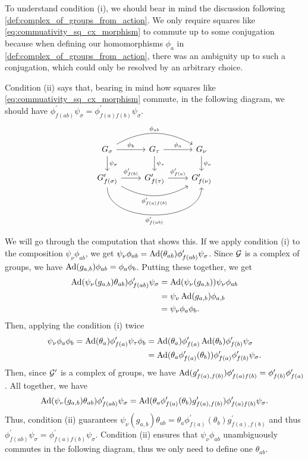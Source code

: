 To understand condition (i), we should bear in mind the discussion following \cref{def:complex_of_groups_from_action}.
We only require squares like \eqref{eq:commuativity_sq_cx_morphism} to commute up to some conjugation because when defining our homomorphisms $\phi_a$ in \cref{def:complex_of_groups_from_action}, there was an ambiguity up to such a conjugation, which could only be resolved by an arbitrary choice.

Condition (ii) says that, bearing in mind how squares like \eqref{eq:commuativity_sq_cx_morphism} commute, in the following diagram, we should have $\phi^\prime_{f(ab)}\psi_\sigma  = \phi^\prime_{f(a)f(b)}\psi_\sigma$.
\begin{equation}
	\begin{tikzcd}
		G_\sigma \ar[d, "\psi_\sigma"] \ar[r, "\phi_b"] \ar[rr, bend left, "\phi_{ab}"] & G_\tau \ar[d, "\psi_\tau"] \ar[r, "\phi_a"] & G_\nu \ar[d, "\psi_\nu"]\\
		G^\prime_{f(\sigma)} \ar[rr, bend right, "\phi^\prime_{f(a)f(b)}"'] \ar[rr, bend right=90, "\phi^\prime_{f(ab)}"'] \ar[r, "\phi^\prime_{f(b)}"] & G^\prime_{f(\tau)} \ar[r, "\phi^\prime_{f(a)}"] & G^\prime_{f(\nu)}
	\end{tikzcd}
	\label{eq:commutativity_double_sq_cx_morphism}
\end{equation}

We will go through the computation that shows this.
If we apply condition (i) to the composition $\psi_\nu \phi_{ab}$, we get $\psi_\nu\phi_{ab} = \operatorname{Ad}(\theta_{ab})\phi^\prime_{f(ab)}\psi_\sigma$.
Since $\mathcal{G}$ is a complex of groups, we have $\operatorname{Ad}(g_{a,b})\phi_{ab} = \phi_a\phi_b$.
Putting these together, we get
\begin{align*}
	\operatorname{Ad}(\psi_\nu(g_{a,b})\theta_{ab})\phi^\prime_{f(ab)}\psi_\sigma
	 & = \operatorname{Ad}(\psi_\nu(g_{a,b}))\psi_\nu\phi_{ab} \\
	 & = \psi_\nu\operatorname{Ad}(g_{a,b})\phi_{a,b}          \\
	 & = \psi_\nu\phi_a\phi_b
	.
\end{align*}
Then, applying the condition (i) twice
\begin{align*}
	\psi_\nu\phi_a\phi_b
	= \operatorname{Ad}(\theta_a)\phi^\prime_{f(a)}\psi_\tau\phi_b
	 & = \operatorname{Ad}(\theta_a)\phi^\prime_{f(a)}\operatorname{Ad}(\theta_b)\phi^\prime_{f(b)}\psi_\sigma                \\
	 & = \operatorname{Ad}(\theta_a\phi^\prime_{f(a)}(\theta_b))\phi^\prime_{f(a)}\phi^\prime_{f(b)}\psi_\sigma
	.
\end{align*}
Then, since $\mathcal{G}^\prime$ is a complex of groups, we have $\operatorname{Ad}(g^\prime_{f(a),f(b)})\phi^\prime_{f(a)f(b)} = \phi^\prime_{f(b)}\phi^\prime_{f(a)}$.
All together, we have
\begin{align*}
	\operatorname{Ad}(\psi_\nu(g_{a,b})\theta_{ab})\phi^\prime_{f(ab)}\psi_\sigma = \operatorname{Ad}(\theta_a\phi^\prime_{f(a)}(\theta_b)g^\prime_{f(a),f(b)})\phi^\prime_{f(a)f(b)}\psi_\sigma
	.
\end{align*}
Thus, condition (ii) guarantees $\psi_\nu(g_{a,b})\theta_{ab} = \theta_a\phi^\prime_{f(a)}(\theta_b)g^\prime_{f(a),f(b)}$ and thus $\phi^\prime_{f(ab)}\psi_\sigma = \phi^\prime_{f(a)f(b)}\psi_\sigma$.
Condition (ii) ensures that $\psi_\nu\phi_{ab}$ unambiguously commutes in the following diagram, thus we only need to define one $\theta_{ab}$.

